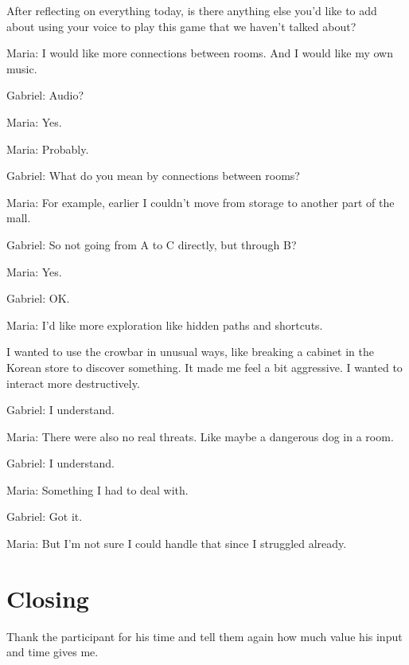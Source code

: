 \begin{QandA}
   \item After reflecting on everything today, is there anything else you’d like to add about using your voice to play this game that we haven't talked about?

         \begin{answered}
            Maria: I would like more connections between rooms.
            And I would like my own music.

            Gabriel: Audio?

            Maria: Yes.

            Maria: Probably.

            Gabriel: What do you mean by connections between rooms?

            Maria: For example, earlier I couldn’t move from storage to another part of the mall.

            Gabriel: So not going from A to C directly, but through B?

            Maria: Yes.

            Gabriel: OK.

            Maria: I’d like more exploration like hidden paths and shortcuts.

            I wanted to use the crowbar in unusual ways, like breaking a cabinet in the Korean store to discover something.
            It made me feel a bit aggressive.
            I wanted to interact more destructively.

            Gabriel: I understand.

            Maria: There were also no real threats.
            Like maybe a dangerous dog in a room.

            Gabriel: I understand.

            Maria: Something I had to deal with.

            Gabriel: Got it.

            Maria: But I’m not sure I could handle that since I struggled already.
         \end{answered}
\end{QandA}

\section{Closing}
Thank the participant for his time and tell them again how much value his input and time gives me.






